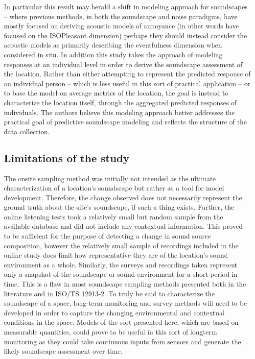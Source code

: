 \documentclass[
  authoryear,
  preprint,
  3p,
  onecolumn]{elsarticle}
\begin{document}
In particular this result may herald a shift in modeling approach for
soundscapes -- where previous methods, in both the soundscape and noise
paradigms, have mostly focused on deriving acoustic models of annoyance
(in other words have focused on the ISOPleasant dimension) perhaps they
should instead consider the acoustic models as primarily describing the
eventfulness dimension when considered in situ. In addition this study
takes the approach of modeling responses at an individual level in order
to derive the soundscape assessment of the location. Rather than either
attempting to represent the predicted response of an individual person
-- which is less useful in this sort of practical application -- or to
base the model on average metrics of the location, the goal is instead
to characterize the location itself, through the aggregated predicted
responses of individuals. The authors believe this modeling approach
better addresses the practical goal of predictive soundscape modeling
and reflects the structure of the data collection.

\hypertarget{limitations-of-the-study}{%
\subsection{Limitations of the study}\label{limitations-of-the-study}}

The onsite sampling method was initially not intended as the ultimate
characterization of a location's soundscape but rather as a tool for
model development. Therefore, the change observed does not necessarily
represent the ground truth about the site's soundscape, if such a thing
exists. Further, the online listening tests took a relatively small but
random sample from the available database and did not include any
contextual information. This proved to be sufficient for the purpose of
detecting a change in sound source composition, however the relatively
small sample of recordings included in the online study does limit how
representative they are of the location's sound environment as a whole.
Similarly, the surveys and recordings taken represent only a snapshot of
the soundscape or sound environment for a short period in time. This is
a flaw in most soundscape sampling methods presented both in the
literature and in ISO/TS 12913-2. To truly be said to characterize the
soundscape of a space, long-term monitoring and survey methods will need
to be developed in order to capture the changing environmental and
contextual conditions in the space. Models of the sort presented here,
which are based on measurable quantities, could prove to be useful in
this sort of longterm monitoring as they could take continuous inputs
from sensors and generate the likely soundscape assessment over time.
\end{document}
